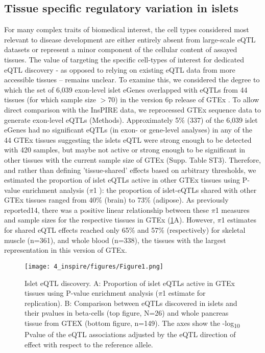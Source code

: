 \subsection{Tissue specific regulatory variation in islets}
For many complex traits of biomedical interest, the cell types considered most relevant to disease development are either entirely absent from large-scale eQTL datasets or represent a minor component of the cellular content of assayed tissues. The value of targeting the specific cell-types of interest for dedicated eQTL discovery - as opposed to relying on existing eQTL data from more accessible tissues – remains unclear. To examine this, we considered the degree to which the set of 6,039 exon-level islet eGenes overlapped with eQTLs from 44 tissues (for which sample size $>$70) in the version 6p release of GTEx \cite{gtexconsortiumGeneticEffectsGene2017}. To allow direct comparison with the InsPIRE data, we reprocessed GTEx sequence data to generate exon-level eQTLs (Methods). Approximately 5\% (337) of the 6,039 islet eGenes had no significant eQTLs (in exon- or gene-level analyses) in any of the 44 GTEx tissues suggesting the islets eQTL were strong enough to be detected with 420 samples, but maybe not active or strong enough to be significant in other tissues with the current sample size of GTEx (Supp. Table ST3). Therefore, and rather than defining 'tissue-shared' effects based on arbitrary thresholds, we estimated the proportion of islet eQTLs active in other GTEx tissues using P-value enrichment analysis ($\pi$1 \cite{storeyDirectApproachFalse2002}): the proportion of islet-eQTLs shared with other GTEx tissues ranged from 40\% (brain) to 73\% (adipose). As previously reported14, there was a positive linear relationship between these $\pi$1 measures and sample sizes for the respective tissues in GTEx (\ref{fig:c4_f1}A). However, $\pi$1 estimates for shared eQTL effects reached only 65\% and 57\% (respectively) for skeletal muscle (n=361), and whole blood (n=338), the tissues with the largest representation in this version of GTEx. \\

\begin{figure}
    \centering
    \texttt{[image: 4\_inspire/figures/Figure1.png]}
    \caption[Islet eQTL discovery]{Islet eQTL discovery. A: Proportion of islet eQTLs active in GTEx tissues using P-value enrichment analysis ($\pi$1 estimate for replication). B: Comparison between eQTLs discovered in islets and their pvalues in beta-cells (top figure, N=26) and whole pancreas tissue from GTEX (bottom figure, n=149). The axes show the -log\textsubscript{10} Pvalue of the eQTL associations adjusted by the eQTL direction of effect with respect to the reference allele.}
    \label{fig:c4_f1}
\end{figure}

